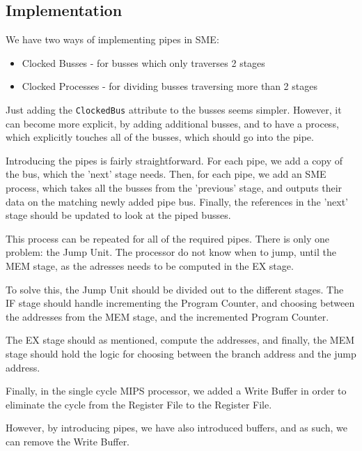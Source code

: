 \documentclass{beamer}
\begin{document}
\subsection{Implementation}
\begin{frame}
    We have two ways of implementing pipes in SME:
    \begin{itemize}
        \item Clocked Busses - for busses which only traverses 2 stages
        \item Clocked Processes - for dividing busses traversing more than 2
            stages
    \end{itemize}
    Just adding the \texttt{ClockedBus} attribute to the busses seems simpler.
    However, it can become more explicit, by adding additional busses, and to
    have a process, which explicitly touches all of the busses, which should go
    into the pipe.
\end{frame}
\begin{frame}
    Introducing the pipes is fairly straightforward. For each pipe, we add a
    copy of the bus, which the 'next' stage needs. Then, for each pipe, we add
    an SME process, which takes all the busses from the 'previous' stage, and
    outputs their data on the matching newly added pipe bus. Finally, the
    references in the 'next' stage should be updated to look at the piped
    busses.
\end{frame}
\begin{frame}
    This process can be repeated for all of the required pipes. There is only
    one problem: the Jump Unit. The processor do not know when to jump, until
    the MEM stage, as the adresses needs to be computed in the EX stage.

    \vspace{\baselineskip}
    To solve this, the Jump Unit should be divided out to the different stages.
    The IF stage should handle incrementing the Program Counter, and choosing
    between the addresses from the MEM stage, and the incremented Program
    Counter.

    \vspace{\baselineskip}
    The EX stage should as mentioned, compute the addresses, and finally, the
    MEM stage should hold the logic for choosing between the branch address and
    the jump address.
\end{frame}
\begin{frame}
    Finally, in the single cycle MIPS processor, we added a Write Buffer in
    order to eliminate the cycle from the Register File to the Register File.

    \vspace{\baselineskip}
    However, by introducing pipes, we have also introduced buffers, and as
    such, we can remove the Write Buffer.
\end{frame}
\end{document}
